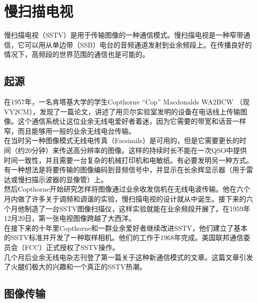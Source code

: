 \chapter*{慢扫描电视}

慢扫描电视（SSTV）是用于传输图像的一种通信模式。慢扫描电视是一种窄带通信，它可以用从单边带（SSB）电台的音频通道发射到业余频段上。在传播良好的情况下，高频段的世界范围的通信也是可能的。

\section{起源}
在1957年，一名肯塔基大学的学生Copthorne “Cop” Macdonalds WA2BCW （现VY2CM），发现了一篇论文，讲述了用贝尔实验室发明的设备在电话线上传输图像。这个通信系统让这位业余无线电爱好者着迷，因为它需要的带宽和话音一样窄，而且能够用一般的业余无线电台传输。\\

在当时另一种图像模式无线电传真（Facsimile）是可用的，但是它需要更长的时间（约20分钟）来传送高分辨率的图像。这样的持续时长不能在一次QSO中提供时间一致性，并且需要一台复杂的机械打印机和电敏纸。有必要发明另一种方式。\\

有一种想法是将要传输的图像编码到音频信号中，并显示在长余辉显示器（用于雷达或慢扫描示波器的显像管）上。\\

然后Copthorne开始研究怎样将图像通过业余收发信机在无线电波传输。他在六个月内做了许多关于调频和调谐的实验，慢扫描电视的设计就从中诞生。接下来的六个月他制造了一台SSTV图像扫描仪，这样实验就能在业余频段开展了。在1959年12月20日，第一张电视图像跨越了大西洋。\\





在接下来的十年里Copthorne和一群业余爱好者继续改进SSTV，他们建立了基本的SSTV标准并开发了一种取样相机。他们的工作于1968年完成。美国联邦通信委员会（FCC）正式授权了SSTV操作。\\

几个月后业余无线电杂志刊登了第一篇关于这种新通信模式的文章。这篇文章引发了火腿们极大的兴趣和一个真正的SSTV热潮。\\

\section{图像传输}

